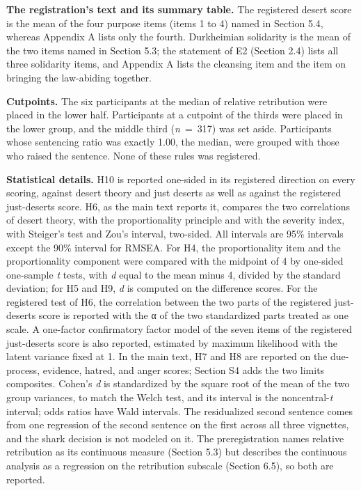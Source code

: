 \textbf{The registration's text and its summary table.} The registered desert score is the mean of the four purpose items (items 1 to 4) named in Section 5.4, whereas Appendix A lists only the fourth. Durkheimian solidarity is the mean of the two items named in Section 5.3; the statement of E2 (Section 2.4) lists all three solidarity items, and Appendix A lists the cleansing item and the item on bringing the law-abiding together.

\textbf{Cutpoints.} The six participants at the median of relative retribution were placed in the lower half. Participants at a cutpoint of the thirds were placed in the lower group, and the middle third (\emph{n}~=~317) was set aside. Participants whose sentencing ratio was exactly 1.00, the median, were grouped with those who raised the sentence. None of these rules was registered.

\textbf{Statistical details.} H10 is reported one-sided in its registered direction on every scoring, against desert theory and just deserts as well as against the registered just-deserts score. H6, as the main text reports it, compares the two correlations of desert theory, with the proportionality principle and with the severity index, with Steiger's test and Zou's interval, two-sided. All intervals are 95\% intervals except the 90\% interval for RMSEA. For H4, the proportionality item and the proportionality component were compared with the midpoint of 4 by one-sided one-sample \emph{t} tests, with \emph{d} equal to the mean minus 4, divided by the standard deviation; for H5 and H9, \emph{d} is computed on the difference scores. For the registered test of H6, the correlation between the two parts of the registered just-deserts score is reported with the α of the two standardized parts treated as one scale. A one-factor confirmatory factor model of the seven items of the registered just-deserts score is also reported, estimated by maximum likelihood with the latent variance fixed at 1. In the main text, H7 and H8 are reported on the due-process, evidence, hatred, and anger scores; Section S4 adds the two limits composites. Cohen's \emph{d} is standardized by the square root of the mean of the two group variances, to match the Welch test, and its interval is the noncentral-\emph{t} interval; odds ratios have Wald intervals. The residualized second sentence comes from one regression of the second sentence on the first across all three vignettes, and the shark decision is not modeled on it. The preregistration names relative retribution as its continuous measure (Section 5.3) but describes the continuous analysis as a regression on the retribution subscale (Section 6.5), so both are reported.

